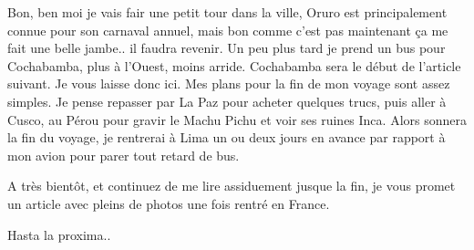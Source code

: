 \begin{multicols}{2}
Bon, ben moi je vais fair une petit tour dans la ville, Oruro est principalement connue pour son carnaval annuel, mais bon comme c'est pas maintenant ça me fait une belle jambe.. il faudra revenir. Un peu plus tard je prend un bus pour Cochabamba, plus à l'Ouest, moins arride. Cochabamba sera le début de l'article suivant. Je vous laisse donc ici. Mes plans pour la fin de mon voyage sont assez simples. Je pense repasser par La Paz pour acheter quelques trucs, puis aller à Cusco, au Pérou pour gravir le Machu Pichu et voir ses ruines Inca. Alors sonnera la fin du voyage, je rentrerai à Lima un ou deux jours en avance par rapport à mon avion pour parer tout retard de bus.

A très bientôt, et continuez de me lire assiduement jusque la fin, je vous promet un article avec pleins de photos une fois rentré en France.

Hasta la proxima..

\end{multicols}

